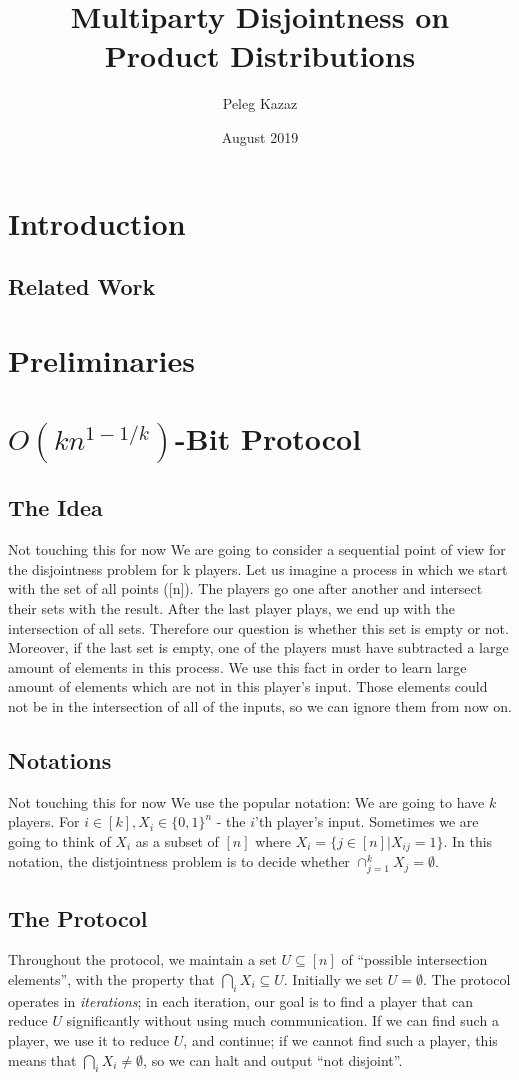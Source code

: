 \documentclass{article}
\title{Multiparty Disjointness on Product Distributions}
\author{Peleg Kazaz}
\date{August 2019}
\newcommand{\Rnote}[1]{ { \color{magenta} #1 } }
\theoremstyle{plain}
\begin{document}
\maketitle


\section{Introduction}

\subsection{Related Work}
\section{Preliminaries}

\section{$O(kn^{1-1/k})$-Bit Protocol}
\subsection{The Idea}
\Rnote{Not touching this for now}
We are going to consider a sequential point of view for the disjointness problem for k players. Let us imagine a process in which we start with the set of all points ([n]). The players go one after another and intersect their sets with the result. After the last player plays, we end up with the intersection of all sets. Therefore our question is whether this set is empty or not. Moreover, if the last set is empty, one of the players must have subtracted a large amount of elements in this process. We use this fact in order to learn large amount of elements which are not in this player's input. Those elements could not be in the intersection of all of the inputs, so we can ignore them from now on. 
\subsection{Notations}
\Rnote{Not touching this for now}
We use the popular notation: We are going to have $k$ players. For $i \in [k], X_i \in \{0,1\}^{n}$ - the $i$'th player's input. Sometimes we are going to think of $X_i$ as a subset of $[n]$ where $X_i = \{j \in [n] | X_{ij} = 1\}$. In this notation, the distjointness problem is to decide whether $\cap^{k}_{j=1}X_j = \emptyset$. \newline
\subsection{The Protocol}
Throughout the protocol, we maintain a set $U \subseteq [n]$ of ``possible intersection elements'', with the property that $\bigcap_i X_i \subseteq U$.
Initially we set $U = \emptyset$.
The protocol operates in \emph{iterations};
in each iteration, our goal is to find a player that can reduce $U$ significantly without using much communication.
If we can find such a player, we use it to reduce $U$, and continue;
if we cannot find such a player, this means that $\bigcap_i X_i \neq \emptyset$, so we can halt and output ``not disjoint''.
\end{document}
